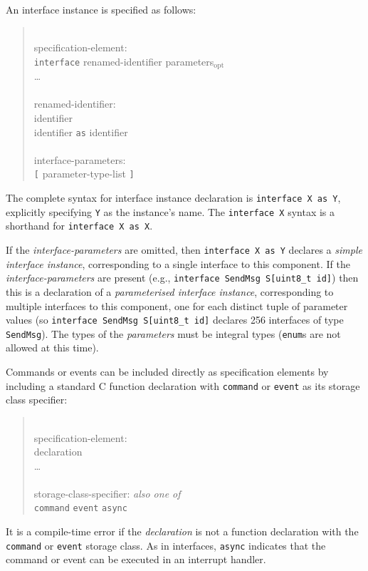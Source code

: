 \documentclass[11pt,letterpaper]{article}
\newcommand{\kw}[1]{{\tt #1}}
\newcommand{\code}[1]{{\tt #1}}
\newcommand{\opt}{$_{\mbox{opt}}$\xspace}
\newcommand{\grammarshift}{\vspace*{-.7cm}}
\newcommand{\grammarindent}{\hspace*{2cm}\= \\ \kill}
\begin{document}
An interface instance is specified as follows:
\begin{quote} \grammarshift \em \begin{tabbing}
\grammarindent
specification-element:\\
\>	\kw{interface} renamed-identifier parameters\opt\\
\>	\ldots\\
\\
renamed-identifier:\\
\>	identifier\\
\>	identifier \kw{as} identifier\\
\\
interface-parameters:\\
\>	\kw{[} parameter-type-list \kw{]}
\end{tabbing} \end{quote}

The complete syntax for interface instance declaration is \code{interface X
as Y}, explicitly specifying \code{Y} as the instance's name. The
\code{interface X} syntax is a shorthand for \code{interface X as X}.

If the \emph{interface-parameters} are omitted, then \code{interface X as
Y} declares a \emph{simple interface instance}, corresponding to a single
interface to this component. If the \emph{interface-parameters} are present
(e.g., \code{interface SendMsg S[uint8\_t id]}) then this is a declaration
of a \emph{parameterised interface instance}, corresponding to multiple
interfaces to this component, one for each distinct tuple of parameter
values (so \code{interface SendMsg S[uint8\_t id]} declares 256 interfaces
of type \code{SendMsg}). The types of the \emph{parameters} must be
integral types (\kw{enum}s are not allowed at this time).

Commands or events can be included directly as specification elements by
including a standard C function declaration with
\kw{command} or \kw{event} as its storage class specifier:
\begin{quote} \grammarshift \em \begin{tabbing}
\grammarindent
specification-element:\\
\>	declaration\\
\>	\ldots\\
\\
storage-class-specifier: \emph{also one of}\\
\>	\kw{command} \kw{event} \kw{async}\\
\end{tabbing} \end{quote}
It is a compile-time error if the \emph{declaration} is not a function
declaration with the \kw{command} or \kw{event} storage class. As in
interfaces, \kw{async} indicates that the command or event can be executed
in an interrupt handler.
\end{document}
